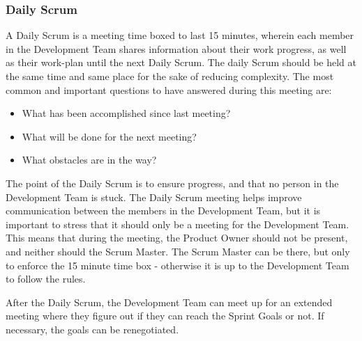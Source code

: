 \subsubsection{Daily Scrum}

A Daily Scrum is a meeting time boxed to last 15 minutes, wherein each member in the
Development Team shares information about their work progress, as well as their work-plan
until the next Daily Scrum\cite{scrumguide11}. The daily Scrum should be held at the same
time and same place for the sake of reducing complexity\cite{scrumguide11}.  The most common
and important questions to have answered during this meeting are:

\begin{itemize}
	\item What has been accomplished since last meeting?
	\item What will be done for the next meeting?
	\item What obstacles are in the way?\cite{scrumguide11}
\end{itemize}


The point of the Daily Scrum is to ensure progress, and that no person in
the Development Team is stuck. The Daily Scrum meeting helps improve
communication between the members in the Development Team, but it is important to stress
that it should only be a meeting for the Development Team\cite{scrumguide11}. This means
that during the meeting, the Product Owner should not be present, and neither should the
Scrum Master. The Scrum Master can be there, but only to enforce the 15 minute time box -
otherwise it is up to the Development Team to follow the rules\cite{scrumguide11}. 


After the Daily Scrum, the Development Team can meet up for an extended meeting where they
figure out if they can reach the Sprint Goals or not. If necessary, the
goals can be renegotiated\cite{scrumguide11}.